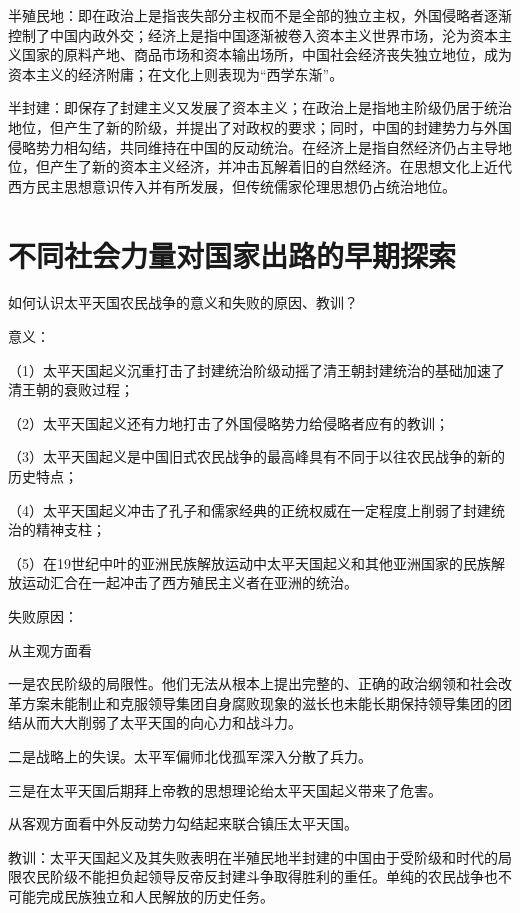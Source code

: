 \documentclass[lang=cn,10pt]{elegantbook}
\begin{document}
	\begin{solution}
		
		半殖民地：即在政治上是指丧失部分主权而不是全部的独立主权，外国侵略者逐渐控制了中国内政外交；经济上是指中国逐渐被卷入资本主义世界市场，沦为资本主义国家的原料产地、商品市场和资本输出场所，中国社会经济丧失独立地位，成为资本主义的经济附庸；在文化上则表现为“西学东渐”。
		
		半封建：即保存了封建主义又发展了资本主义；在政治上是指地主阶级仍居于统治地位，但产生了新的阶级，并提出了对政权的要求；同时，中国的封建势力与外国侵略势力相勾结，共同维持在中国的反动统治。在经济上是指自然经济仍占主导地位，但产生了新的资本主义经济，并冲击瓦解着旧的自然经济。在思想文化上近代西方民主思想意识传入并有所发展，但传统儒家伦理思想仍占统治地位。
	\end{solution}
	\chapter{不同社会力量对国家出路的早期探索}
	\begin{example}
		如何认识太平天国农民战争的意义和失败的原因、教训？
	\end{example}
	\begin{solution}
		意义：	
		
		（1）太平天国起义沉重打击了封建统治阶级动摇了清王朝封建统治的基础加速了清王朝的衰败过程；	
		
		（2）太平天国起义还有力地打击了外国侵略势力给侵略者应有的教训；	
		
		（3）太平天国起义是中国旧式农民战争的最高峰具有不同于以往农民战争的新的历史特点；	
		
		（4）太平天国起义冲击了孔子和儒家经典的正统权威在一定程度上削弱了封建统治的精神支柱；	
		
		（5）在19世纪中叶的亚洲民族解放运动中太平天国起义和其他亚洲国家的民族解放运动汇合在一起冲击了西方殖民主义者在亚洲的统治。	
		
		失败原因：
		
		从主观方面看	
		
		一是农民阶级的局限性。他们无法从根本上提出完整的、正确的政治纲领和社会改革方案未能制止和克服领导集团自身腐败现象的滋长也未能长期保持领导集团的团结从而大大削弱了太平天国的向心力和战斗力。	
		
		二是战略上的失误。太平军偏师北伐孤军深入分散了兵力。	
		
		三是在太平天国后期拜上帝教的思想理论绐太平天国起义带来了危害。
		
		从客观方面看中外反动势力勾结起来联合镇压太平天国。	
		
		教训：太平天国起义及其失败表明在半殖民地半封建的中国由于受阶级和时代的局限农民阶级不能担负起领导反帝反封建斗争取得胜利的重任。单纯的农民战争也不可能完成民族独立和人民解放的历史任务。
	\end{solution}
\end{document}
